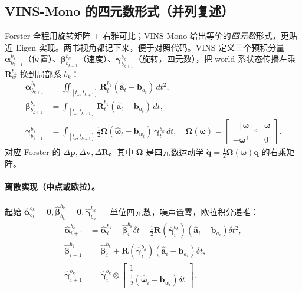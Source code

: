 \subsection{VINS-Mono 的四元数形式（并列复述）}
\label{sec:vio-preint-vins}

Forster 全程用旋转矩阵 $+$ 右雅可比；VINS-Mono\cite{qin2018vins} 给出等价的\emph{四元数}形式，更贴近 Eigen 实现。两书视角都记下来，便于对照代码。VINS 定义三个预积分量 $\boldsymbol{\alpha}^{b_k}_{b_{k+1}}$（位置）、$\boldsymbol{\beta}^{b_k}_{b_{k+1}}$（速度）、$\boldsymbol{\gamma}^{b_k}_{b_{k+1}}$（旋转，四元数），把 world 系状态传播左乘 $\mathbf{R}^{b_k}_w$ 换到局部系 $b_k$：
\begin{equation}
\begin{aligned}
  \boldsymbol{\alpha}^{b_k}_{b_{k+1}}&=\iint_{[t_k,t_{k+1}]}\mathbf{R}^{b_k}_t(\hat{\mathbf{a}}_t-\mathbf{b}_{a_t})\,dt^2,\\
  \boldsymbol{\beta}^{b_k}_{b_{k+1}}&=\int_{[t_k,t_{k+1}]}\mathbf{R}^{b_k}_t(\hat{\mathbf{a}}_t-\mathbf{b}_{a_t})\,dt,\\
  \boldsymbol{\gamma}^{b_k}_{b_{k+1}}&=\int_{[t_k,t_{k+1}]}\tfrac12\boldsymbol{\Omega}(\hat{\boldsymbol{\omega}}_t-\mathbf{b}_{w_t})\,\boldsymbol{\gamma}^{b_k}_t\,dt,
  \quad
  \boldsymbol{\Omega}(\boldsymbol{\omega})=\begin{bmatrix}-\lfloor\boldsymbol{\omega}\rfloor_\times & \boldsymbol{\omega}\\ -\boldsymbol{\omega}^\top & 0\end{bmatrix}.
\end{aligned}
  \label{eq:vio-vins-preint}
\end{equation}
对应 Forster 的 $\Delta\mathbf{p},\Delta\mathbf{v},\Delta\mathbf{R}$。其中 $\boldsymbol{\Omega}$ 是四元数运动学 $\dot{\mathbf{q}}=\tfrac12\boldsymbol{\Omega}(\boldsymbol{\omega})\mathbf{q}$ 的右乘矩阵。

\paragraph{离散实现（中点或欧拉）。}
起始 $\hat{\boldsymbol{\alpha}}^{b_k}_{b_k}=\mathbf{0},\hat{\boldsymbol{\beta}}^{b_k}_{b_k}=\mathbf{0},\hat{\boldsymbol{\gamma}}^{b_k}_{b_k}=$ 单位四元数，噪声置零，欧拉积分递推：
\begin{equation}
\begin{aligned}
  \hat{\boldsymbol{\alpha}}^{b_k}_{i+1}&=\hat{\boldsymbol{\alpha}}^{b_k}_{i}+\hat{\boldsymbol{\beta}}^{b_k}_{i}\delta t+\tfrac12\mathbf{R}(\hat{\boldsymbol{\gamma}}^{b_k}_{i})(\hat{\mathbf{a}}_i-\mathbf{b}_{a_i})\delta t^2,\\
  \hat{\boldsymbol{\beta}}^{b_k}_{i+1}&=\hat{\boldsymbol{\beta}}^{b_k}_{i}+\mathbf{R}(\hat{\boldsymbol{\gamma}}^{b_k}_{i})(\hat{\mathbf{a}}_i-\mathbf{b}_{a_i})\delta t,\\
  \hat{\boldsymbol{\gamma}}^{b_k}_{i+1}&=\hat{\boldsymbol{\gamma}}^{b_k}_{i}\otimes\begin{bmatrix}1\\ \tfrac12(\hat{\boldsymbol{\omega}}_i-\mathbf{b}_{w_i})\delta t\end{bmatrix}.
\end{aligned}
  \label{eq:vio-vins-discrete}
\end{equation}


